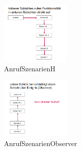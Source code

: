 \documentclass{article}
\begin{document}
\begin{multicols}{2}

\begin{figure}[H]			\includegraphics[width=0.3\textwidth] {Resources/Images/AnrufSzenarienH.png}
\caption{\label{fig:AnrufSzenarienH}AnrufSzenarienH}
\end{figure}


\columnbreak


\begin{figure}[H]			\includegraphics[width=0.3\textwidth] {Resources/Images/AnrufSzenarienObserver.png}
\caption{\label{fig:AnrufSzenarienObserver}AnrufSzenarienObserver}
\end{figure}

\end{multicols}
\end{document}
